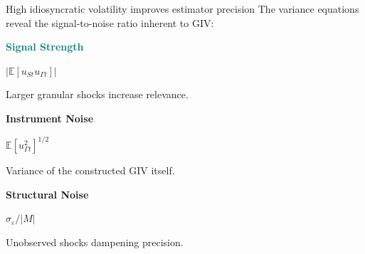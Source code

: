 \documentclass[aspectratio=169,11pt]{beamer}
\begin{document}
\begin{frame}[shrink]{High idiosyncratic volatility improves estimator precision}
    \vspace{0.5cm}
    \centering
    The variance equations reveal the signal-to-noise ratio inherent to GIV:

    \vspace{0.8cm}
    \begin{minipage}{0.3\textwidth}
        \centering
        \textcolor{Teal}{\textbf{Signal Strength}}

        \vspace{0.2cm}
        $|\mathbb{E}[u_{St} u_{\Gamma t}]|$

        \vspace{0.2cm}
        Larger granular shocks increase relevance.
    \end{minipage}
    \hfill
    \begin{minipage}{0.3\textwidth}
        \centering
        \textcolor{WarmOrange}{\textbf{Instrument Noise}}

        \vspace{0.2cm}
        $\mathbb{E}[u_{\Gamma t}^2]^{1/2}$

        \vspace{0.2cm}
        Variance of the constructed GIV itself.
    \end{minipage}
    \hfill
    \begin{minipage}{0.3\textwidth}
        \centering
        \textcolor{SoftPurple}{\textbf{Structural Noise}}

        \vspace{0.2cm}
        $\sigma_{\varepsilon} / |M|$

        \vspace{0.2cm}
        Unobserved shocks dampening precision.
    \end{minipage}
    \vspace{0.1cm}
    \hfill \hyperlink{src_propositions}{}
\end{frame}
\end{document}
